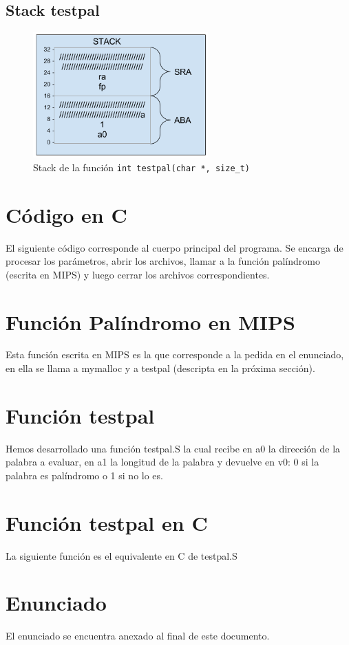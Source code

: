 \documentclass[11pt,a4paper]{article}
\begin{document}
\subsection{Stack testpal}
\begin{figure}[H]
	\centering	
	\includegraphics[width=0.6\textwidth]{stack_testpal}
	\caption{Stack de la función \texttt{int testpal(char *, size\_t)}}
\end{figure}




\section{Código en C}
El siguiente código corresponde al cuerpo principal del programa. Se encarga de procesar los parámetros, abrir los archivos, llamar a la función palíndromo (escrita en MIPS) y luego cerrar los archivos correspondientes.



\section{Función Palíndromo en MIPS}
Esta función escrita en MIPS es la que corresponde a la pedida en el enunciado, en ella se llama a mymalloc y a testpal (descripta en la próxima sección).



\section{Función testpal}
Hemos desarrollado una función testpal.S la cual recibe en a0 la dirección de la palabra a evaluar, en a1 la longitud de la palabra y devuelve en v0: 0 si la palabra es palíndromo o 1 si no lo es.



\section{Función testpal en C}
La siguiente función es el equivalente en C de testpal.S



\section{Enunciado}
El enunciado se encuentra anexado al final de este documento.
\end{document}
